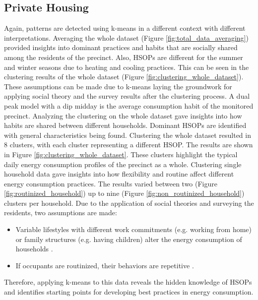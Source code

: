 \subsection{Private Housing}
Again, patterns are detected using k-means in a different context with different interpretations.
Averaging the whole dataset (Figure \ref{fig:total_data_averaging}) provided insights into dominant practices and habits that are socially shared among the residents of the precinct.
Also, HSOPs are different for the summer and winter seasons due to heating and cooling practices.
This can be seen in the clustering results of the whole dataset (Figure \ref{fig:clustering_whole_dataset}).
These assumptions can be made due to k-means laying the groundwork for applying social theory and the survey results after the clustering process.
A dual peak model with a dip midday is the average consumption habit of the monitored precinct.
Analyzing the clustering on the whole dataset gave insights into how habits are shared between different households.
Dominant HSOPs are identified with general characteristics being found.
Clustering the whole dataset resulted in 8 clusters, with each cluster representing a different HSOP.
The results are shown in Figure \ref{fig:clustering_whole_dataset}.
These clusters highlight the typical daily energy consumption profiles of the precinct as a whole.
Clustering single household data gave insights into how flexibility and routine affect different energy consumption practices.
The results varied between two (Figure \ref{fig:routinized_household}) up to nine (Figure \ref{fig:non_routinized_household}) clusters per household.
Due to the application of social theories and surveying the residents, two assumptions are made:
\begin{itemize}
    \item Variable lifestyles with different work commitments (e.g. working from home) or family structures (e.g. having children) alter the energy consumption of households \cite{KUR-HBP}.
    \item If occupants are routinized, their behaviors are repetitive \cite{BRE-EWP}.
\end{itemize}
Therefore, applying k-means to this data reveals the hidden knowledge of HSOPs and identifies starting points for developing best practices in energy consumption.

